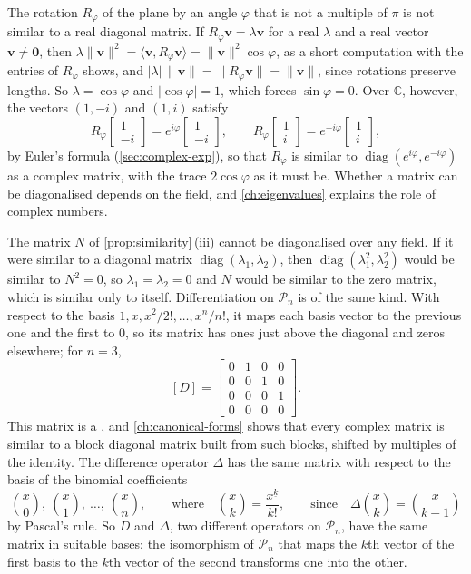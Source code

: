 The rotation $R_\varphi$ of the plane by an angle $\varphi$ that is not a multiple of $\pi$ is not similar to a real diagonal matrix. If $R_\varphi\mathbf v=\lambda\mathbf v$ for a real $\lambda$ and a real vector $\mathbf v\ne\mathbf 0$, then $\lambda\|\mathbf v\|^2=\langle\mathbf v,R_\varphi\mathbf v\rangle=\|\mathbf v\|^2\cos\varphi$, as a short computation with the entries of $R_\varphi$ shows, and $|\lambda|\,\|\mathbf v\|=\|R_\varphi\mathbf v\|=\|\mathbf v\|$, since rotations preserve lengths. So $\lambda=\cos\varphi$ and $|\cos\varphi|=1$, which forces $\sin\varphi=0$. Over $\mathbb C$, however, the vectors $(1,-i)$ and $(1,i)$ satisfy
\[
R_\varphi\begin{bmatrix}1\\-i\end{bmatrix}=e^{i\varphi}\begin{bmatrix}1\\-i\end{bmatrix},\qquad R_\varphi\begin{bmatrix}1\\i\end{bmatrix}=e^{-i\varphi}\begin{bmatrix}1\\i\end{bmatrix},
\]
by Euler's formula (\cref{sec:complex-exp}), so that $R_\varphi$ is similar to $\operatorname{diag}(e^{i\varphi},e^{-i\varphi})$ as a complex matrix, with the trace $2\cos\varphi$ as it must be. Whether a matrix can be diagonalised depends on the field, and \cref{ch:eigenvalues} explains the role of complex numbers.

The matrix $N$ of \cref{prop:similarity}\,(iii) cannot be diagonalised over any field. If it were similar to a diagonal matrix $\operatorname{diag}(\lambda_1,\lambda_2)$, then $\operatorname{diag}(\lambda_1^2,\lambda_2^2)$ would be similar to $N^2=0$, so $\lambda_1=\lambda_2=0$ and $N$ would be similar to the zero matrix, which is similar only to itself. Differentiation on $\mathcal P_n$ is of the same kind. With respect to the basis $1,x,x^2/2!,\ldots,x^n/n!$, it maps each basis vector to the previous one and the first to $0$, so its matrix has ones just above the diagonal and zeros elsewhere; for $n=3$,
\[
[D]=\begin{bmatrix}0&1&0&0\\0&0&1&0\\0&0&0&1\\0&0&0&0\end{bmatrix}.
\]
This matrix is a , and \cref{ch:canonical-forms} shows that every complex matrix is similar to a block diagonal matrix built from such blocks, shifted by multiples of the identity. The difference operator $\Delta$ has the same matrix with respect to the basis of the binomial coefficients
\[
\binom x0,\ \binom x1,\ \ldots,\ \binom xn,\qquad\text{where}\quad\binom xk=\frac{x^{\underline k}}{k!},\qquad\text{since}\quad\Delta\binom xk=\binom x{k-1}
\]
by Pascal's rule. So $D$ and $\Delta$, two different operators on $\mathcal P_n$, have the same matrix in suitable bases: the isomorphism of $\mathcal P_n$ that maps the $k$th vector of the first basis to the $k$th vector of the second transforms one into the other.

